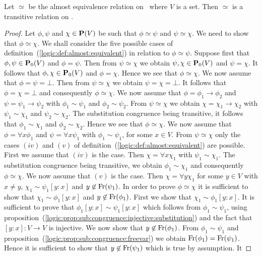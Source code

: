 \begin{prop}\label{logic:prop:almost:transitive}
Let $\simeq$ be the almost equivalence relation on \pv\ where $V$ is
a set. Then $\simeq$ is a transitive relation on \pv.
\end{prop}
\begin{proof}
Let $\phi,\psi$ and $\chi\in\mbox{${\bf P}(V)$}$ be such that $\phi\simeq\psi$ and
$\psi\simeq\chi$. We need to show that $\phi\simeq\chi$. We shall
consider the five possible cases of
definition~(\ref{logic:def:almost:equivalent}) in relation to
$\phi\simeq\psi$. Suppose first that $\phi,\psi\in\mbox{${\bf P}_{0}(V)$}$ and
$\phi=\psi$. Then from $\psi\simeq\chi$ we obtain $\psi,\chi\in\mbox{${\bf P}_{0}(V)$}$
and $\psi=\chi$. It follows that $\phi,\chi\in\mbox{${\bf P}_{0}(V)$}$ and $\phi=\chi$.
Hence we see that $\phi\simeq\chi$. We now assume that
$\phi=\psi=\bot$. Then from $\psi\simeq\chi$ we obtain
$\psi=\chi=\bot$. It follows that $\phi=\chi=\bot$ and consequently
$\phi\simeq\chi$. We now assume that $\phi=\phi_{1}\to\phi_{2}$ and
$\psi=\psi_{1}\to\psi_{2}$ with $\phi_{1}\sim\psi_{1}$ and
$\phi_{2}\sim\psi_{2}$. From $\psi\simeq\chi$ we obtain
$\chi=\chi_{1}\to\chi_{2}$ with $\psi_{1}\sim\chi_{1}$ and
$\psi_{2}\sim\chi_{2}$. The substitution congruence being
transitive, it follows that $\phi_{1}\sim\chi_{1}$ and
$\phi_{2}\sim\chi_{2}$. Hence we see that $\phi\simeq\chi$. We now
assume that $\phi=\forall x\phi_{1}$ and $\psi=\forall x\psi_{1}$
with $\phi_{1}\sim\psi_{1}$, for some $x\in V$. From
$\psi\simeq\chi$ only the cases $(iv)$ and $(v)$ of
definition~(\ref{logic:def:almost:equivalent}) are possible. First
we assume that $(iv)$ is the case. Then $\chi=\forall x\chi_{1}$
with $\psi_{1}\sim\chi_{1}$. The substitution congruence being
transitive, we obtain $\phi_{1}\sim\chi_{1}$ and consequently
$\phi\simeq\chi$. We now assume that $(v)$ is the case. Then
$\chi=\forall y\chi_{1}$ for some $y\in V$ with $x\neq y$,
$\chi_{1}\sim\psi_{1}[y\!:\!x]$ and $y\not\in\mbox{\rm Fr}(\psi_{1})$. In
order to prove $\phi\simeq\chi$ it is sufficient to show that
$\chi_{1}\sim\phi_{1}[y\!:\!x]$ and $y\not\in\mbox{\rm Fr}(\phi_{1})$. First
we show that $\chi_{1}\sim\phi_{1}[y\!:\!x]$. It is sufficient to
prove that $\phi_{1}[y\!:\!x]\sim\psi_{1}[y\!:\!x]$ which follows
from $\phi_{1}\sim\psi_{1}$, using
proposition~(\ref{logic:prop:sub:congruence:injective:substitution})
and the fact that $[y\!:\!x]:V\to V$ is injective. We now show that
$y\not\in\mbox{\rm Fr}(\phi_{1})$. From $\phi_{1}\sim\psi_{1}$ and
proposition~(\ref{logic:prop:sub:congruence:freevar}) we obtain
$\mbox{\rm Fr}(\phi_{1})=\mbox{\rm Fr}(\psi_{1})$. Hence it is sufficient to show
that $y\not\in\mbox{\rm Fr}(\psi_{1})$ which is true by assumption. It

\end{proof}
